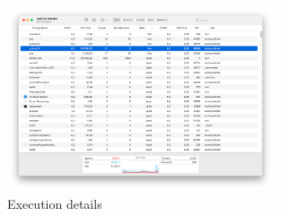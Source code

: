 \documentclass[conference,onecolumn]{IEEEtran}
\begin{document}
    \begin{figure}
        \centering
        \includegraphics[width=0.7\textwidth]{ExucutionDetails.png}
        \caption{Execution details}
        \label{appdx:executionDetails}
    \end{figure}

\newpage


\end{document}
